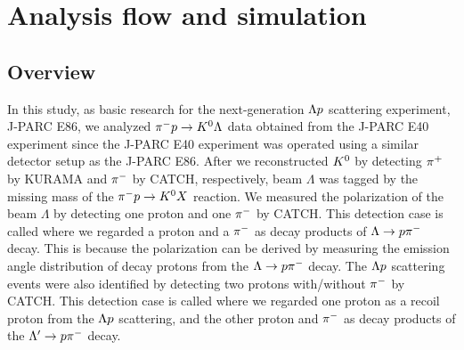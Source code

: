 %

\graphicspath{{./pictures/chapter_Anaflow/}}

\chapter{Analysis flow and simulation} 
\label{chap-Anaflow}

\section{Overview}
\label{sec-overview}
In this study, as basic research for the next-generation $\Lambda p$ scattering experiment, J-PARC E86, we analyzed $\pi^- p \to K^0 \Lambda$ data obtained from the J-PARC E40 experiment since the J-PARC E40 experiment was operated using a similar detector setup as the J-PARC E86. After we reconstructed $K^{0}$ by detecting $\pi^{+}$ by KURAMA and $\pi^{-}$ by CATCH, respectively, beam $\Lambda$ was tagged by the missing mass of the $\pi^- p \to K^0 X$ reaction. We measured the polarization of the beam $\Lambda$ by detecting one proton and one $\pi^{-}$ by CATCH. This detection case is called  where we regarded a proton and a $\pi^{-}$ as decay products of $\Lambda\to p\pi^{-}$ decay. This is because the polarization can be derived by measuring the emission angle distribution of decay protons from the $\Lambda\to p\pi^{-}$ decay. The $\Lambda p$ scattering events were also identified by detecting two protons with/without $\pi^{-}$ by CATCH. This detection case is called  where we regarded one proton as a recoil proton from the $\Lambda p$ scattering, and the other proton and $\pi^{-}$ as decay products of the $\Lambda'\to p\pi^{-}$ decay. 

